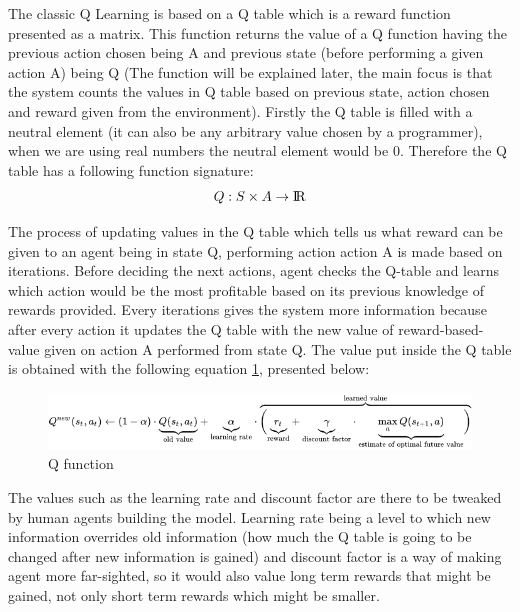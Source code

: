 \documentclass[]{article}
\begin{document}
\par The classic Q Learning is based on a Q table which is a reward function presented as a matrix. This function returns the value of a Q function having the previous action chosen being A and previous state (before performing a given action A) being Q (The function will be explained later, the main focus is that the system counts the values in Q table based on previous state, action chosen and reward given from the environment). Firstly the Q table is filled with a neutral element (it can also be any arbitrary value chosen by a programmer), when we are using real numbers the neutral element would be 0. Therefore the Q table has a following function signature: 
\begin{equation}
Q : S \times A \rightarrow \rm I\!R
\end{equation}

\par The process of updating values in the Q table which tells us what reward can be given to an agent being in state Q, performing action action A is made based on iterations. Before deciding the next actions, agent checks the Q-table and learns which action would be the most profitable based on its previous knowledge of rewards provided. Every iterations gives the system more information because after every action it updates the Q table with the new value of reward-based-value given on action A performed from state Q. The value put inside the Q table is obtained with the following equation \ref{fig:qlearn}, presented below: 

\begin{figure}[h]
	\centering
	\includegraphics[scale=0.6]{qlearn}
	\caption{Q function}
	\label{fig:qlearn}
\end{figure}

\par The values such as the learning rate and discount factor are there to be tweaked by human agents building the model. Learning rate being a level to which new information overrides old information (how much the Q table is going to be changed after new information is gained) and discount factor is a way of making agent more far-sighted, so it would also value long term rewards that might be gained, not only short term rewards which might be smaller. 
\end{document}
